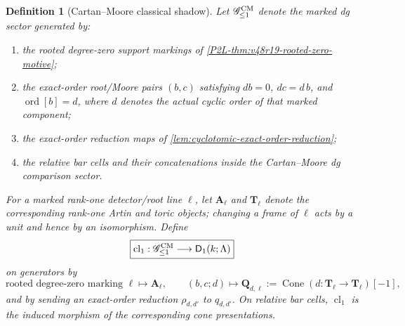 \documentclass[11pt]{article}
\newtheorem{definition}[theorem]{Definition}
\theoremstyle{remark}
\begin{document}
\begin{definition}[Cartan--Moore classical shadow]
\label{def:cartan-moore-classical-shadow}
Let $\mathscr G^{\rm CM}_{\le1}$ denote the marked dg sector generated by:
\begin{enumerate}[label=\textup{(\roman*)}]
\item the rooted degree-zero support markings of
      \cref{P2L-thm:v48r19-rooted-zero-motive};
\item the exact-order root/Moore pairs $(b,c)$ satisfying
      $db=0$, $dc=d\,b$, and $\operatorname{ord}[b]=d$, where $d$ denotes the actual
      cyclic order of that marked component;
\item the exact-order reduction maps of
      \cref{lem:cyclotomic-exact-order-reduction};
\item the relative bar cells and their concatenations inside the Cartan--Moore dg
      comparison sector.
\end{enumerate}
For a marked rank-one detector/root line $\ell$, let $\mathbf A_\ell$ and
$\mathbf T_\ell$ denote the corresponding rank-one Artin and toric objects; changing a
frame of $\ell$ acts by a unit and hence by an isomorphism.  Define
\begin{equation}\label{eq:classical-shadow-functor}
 \boxed{
 \operatorname{cl}_1:\mathscr G^{\rm CM}_{\le1}
 \longrightarrow\mathsf D_1(k;\Lambda)}
\end{equation}
on generators by
\[
 \text{rooted degree-zero marking }\ell\longmapsto\mathbf A_\ell,
 \qquad
 (b,c;d)\longmapsto
 \mathbf Q_{d,\ell}:=
 \operatorname{Cone}(d:\mathbf T_\ell\to\mathbf T_\ell)[-1],
\]
and by sending an exact-order reduction $\rho_{d,d'}$ to $q_{d,d'}$.
On relative bar cells, $\operatorname{cl}_1$ is the induced morphism of the corresponding
cone presentations.
\end{definition}
\end{document}

